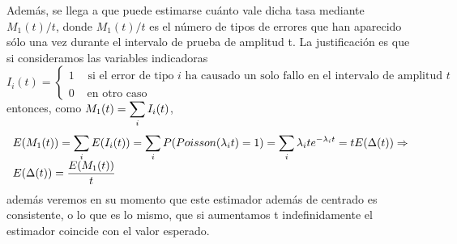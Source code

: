 \par
Adem\'{a}s, se llega a que puede estimarse cu\'{a}nto vale dicha tasa
mediante $M_1(t)/t$, donde $M_1(t)/t$ es el n\'{u}mero de tipos de
errores que han aparecido s\'{o}lo una vez durante el intervalo de
prueba de amplitud t. La justificaci\'{o}n es que si consideramos las
variables indicadoras
\[
I_i(t)=\left \{
\begin{array}{ll}
1&\begin{array}{l} \text{si el error de tipo $i$ ha causado un
solo fallo en el intervalo de amplitud $t$}
\end{array}\\
0&\text{ en otro caso}
\end{array}\right.
\]
entonces, como $M_1(t)=\displaystyle\displaystyle\sum_i I_i(t)$,
\[
\begin{array}{l}
E(M_1(t))=\displaystyle\displaystyle\sum_i
E(I_i(t))=\displaystyle\displaystyle\sum_i P(Poisson(\lambda_i
t)=1)=
\displaystyle\displaystyle\sum_i \lambda_i te^{-\lambda_i t}=t E(\Delta(t))\Rightarrow\\
E(\Delta(t))=\dfrac{E(M_1(t))}{t}
\end{array}
\]
adem\'{a}s veremos en su momento que este estimador adem\'{a}s de centrado
es consistente, o lo que es lo mismo, que si aumentamos t
indefinidamente el estimador coincide con el valor esperado.
